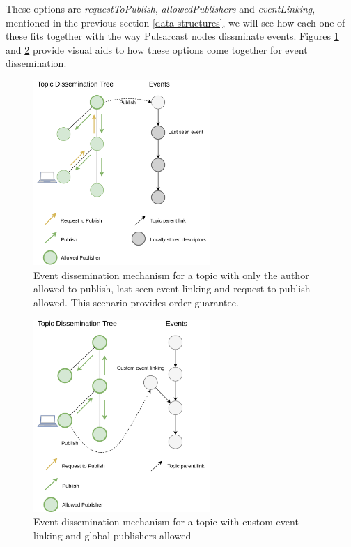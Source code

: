 These options are \emph{requestToPublish}, \emph{allowedPublishers} and
\emph{eventLinking}, mentioned in the previous section \ref{data-structures},
we will see how each one of these fits together with the way Pulsarcast nodes
dissminate events. Figures \ref{fig:pulsarcast-publish-order-guarantee} and
\ref{fig:pulsarcast-publish-custom} provide visual aids to how these options
come together for event dissemination.

\begin{figure}[hb!]
  \centering
  \includegraphics[width=0.6\textwidth]{img/pulsarcast-publish-order-guarantee.png}
  \caption{Event dissemination mechanism for a topic with only the author allowed to publish, last seen event linking and request to publish allowed. This scenario provides order guarantee.}
  \label{fig:pulsarcast-publish-order-guarantee}
\end{figure}

\begin{figure}[hb!]
  \centering
  \includegraphics[width=0.6\textwidth]{img/pulsarcast-publish-custom.png}
  \caption{Event dissemination mechanism for a topic with custom event linking and global publishers allowed}
  \label{fig:pulsarcast-publish-custom}
\end{figure}

